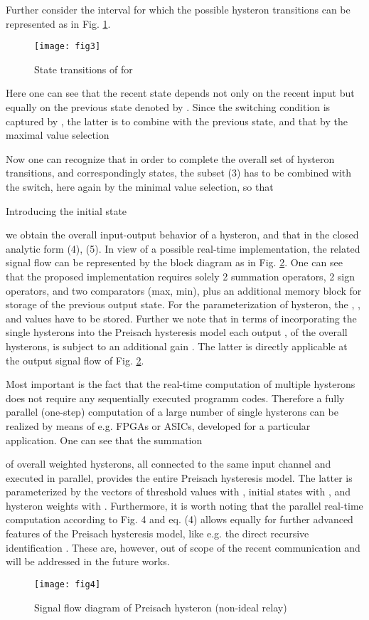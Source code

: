 \documentclass[journal]{IEEEtran}
\begin{document}
Further consider the interval  for which
the possible hysteron transitions can be represented as in Fig.
\ref{fig:3}.
\begin{figure}[!h]
\centering
\texttt{[image: fig3]}
\caption{State transitions of  for }
\label{fig:3}
\end{figure}
Here one can see that the recent state  depends not only on the
recent input but equally on the previous state denoted by
. Since the switching condition is captured by
, the latter is to combine with the
previous state, and that by the maximal value selection


Now one can recognize that in order to complete the overall set of
hysteron transitions, and correspondingly states,  the subset (3)
has to be combined with the  switch, here
again by the minimal value selection, so that

Introducing the initial state

we obtain the overall input-output behavior of a hysteron, and
that in the closed analytic form (4), (5). In view of a possible
real-time implementation, the related signal flow can be
represented by the block diagram as in Fig. \ref{fig:4}. One can
see that the proposed implementation requires solely 2 summation
operators, 2 sign operators, and two comparators (max, min), plus
an additional memory block for storage of the previous output
state. For the parameterization of hysteron, the ,
, and  values have to be stored. Further we note
that in terms of incorporating the single hysterons into the
Preisach hysteresis model each output , of the overall  hysterons, is subject to an additional gain . The
latter is directly applicable at the output signal flow of Fig.
\ref{fig:4}.

Most important is the fact that the real-time computation of
multiple hysterons does not require any sequentially executed
programm codes. Therefore a fully parallel (one-step) computation
of a large number of single hysterons can be realized by means of
e.g. FPGAs or ASICs, developed for a particular application. One
can see that the summation

of overall  weighted hysterons, all connected to the same input
channel and executed in parallel, provides the entire Preisach
hysteresis model. The latter is parameterized by the vectors of
threshold values  with
, initial states  with , and
hysteron weights  with . Furthermore, it is worth noting that the parallel real-time computation
according to Fig. 4 and eq. (4) allows equally for further
advanced features of the Preisach hysteresis model, like e.g. the
direct recursive identification \cite{ruderman2013,ruder2015}.
These are, however, out of scope of the recent communication and
will be addressed in the future works.
\begin{figure}[!h]
\centering
\texttt{[image: fig4]}
\caption{Signal flow diagram of Preisach hysteron (non-ideal
relay)} \label{fig:4}
\end{figure}
\end{document}
